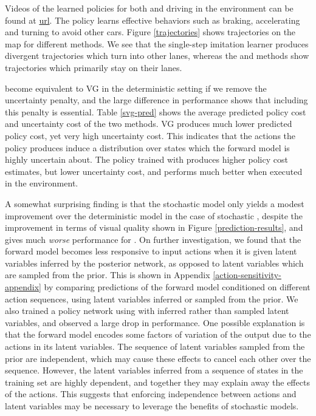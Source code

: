\documentclass{article} %
\begin{document}
Videos of the learned policies for both \modelnameil and \modelnamedrop driving in the environment can be found at \url{url}.
The policy learns effective behaviors such as braking, accelerating and turning to avoid other cars.
Figure \ref{trajectories} shows trajectories on the map for different methods. We see that the single-step imitation learner produces divergent trajectories which turn into other lanes, whereas the \modelnamedrop and \modelnameil methods show trajectories which primarily stay on their lanes. 

\modelnamedrop become equivalent to VG in the deterministic setting if we remove the uncertainty penalty, and the large difference in performance shows that including this penalty is essential.
Table \ref{svg-pred} shows the average predicted policy cost and uncertainty cost of the two methods.
VG produces much lower predicted policy cost, yet very high uncertainty cost. This indicates that the actions the policy produces induce a distribution over states which the forward model is highly uncertain about. The policy trained with \modelnamedrop produces higher policy cost estimates, but lower uncertainty cost, and performs much better when executed in the environment.

A somewhat surprising finding is that the stochastic model only yields a modest improvement over the deterministic model in the case of stochastic \modelnamedrop, despite the improvement in terms of visual quality shown in Figure \ref{prediction-results}, and gives much \textit{worse} performance for \modelnameil.
On further investigation, we found that the forward model becomes less responsive to input actions when it is given latent variables inferred by the posterior network, as opposed to latent variables which are sampled from the prior. This is shown in Appendix \ref{action-sensitivity-appendix} by comparing predictions of the forward model conditioned on different action sequences, using latent variables inferred or sampled from the prior. We also trained a policy network using \modelnamedrop with inferred rather than sampled latent variables, and observed a large drop in performance.
One possible explanation is that the forward model encodes some factors of variation of the output due to the actions in its latent variables.
The sequence of latent variables sampled from the prior are independent, which may cause these effects to cancel each other over the sequence. However, the latent variables inferred from a sequence of states in the training set are highly dependent, and together they may explain away the effects of the actions.
This suggests that enforcing independence between actions and latent variables may be necessary to leverage the benefits of stochastic models.
\end{document}
